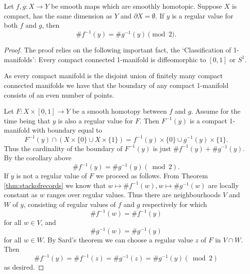 \begin{lemma}
    Let $f, g: X \rightarrow Y$ be smooth maps which are smoothly homotopic. Suppose $X$ is compact, has the same dimension as $Y$ and $\partial X=\emptyset$. If $y$ is a regular value for both $f$ and $g$, then
$$
\# f^{-1}(y)=\# g^{-1}(y) \pmod{2}.
$$
\end{lemma}
\begin{proof}
The proof relies on the following important fact, the `Classification of 1-manifolds': Every compact connected 1-manifold is diffeomorphic to $[0,1]$ or $S^{1}$.

As every compact manifold is the disjoint union of finitely many compact connected manifolds we have that the boundary of any compact 1-manifold consists of an even number of points.

Let $F: X \times[0,1] \rightarrow Y$ be a smooth homotopy between $f$ and $g$. Assume for the time being that $y$ is also a regular value for $F$. Then $F^{-1}(y)$ is a compact 1-manifold with boundary equal to
$$
F^{-1}(y) \cap(X \times\{0\} \cup X \times\{1\})=f^{-1}(y) \times\{0\} \cup g^{-1}(y) \times\{1\}.
$$
Thus the cardinality of the boundary of $F^{-1}(y)$ is just $\# f^{-1}(y)+\# g^{-1}(y)$. By the corollary above
$$
\# f^{-1}(y)=\# g^{-1}(y)(\bmod 2).
$$
If $y$ is not a regular value of $F$ we proceed as follows. From Theorem \ref{thm:stackofrecords} we know that $w \mapsto \# f^{-1}(w), w \mapsto \# g^{-1}(w)$ are locally constant as $w$ ranges over regular values. Thus there are neighbourhoods $V$ and $W$ of $y$, consisting of regular values of $f$ and $g$ respectively for which
$$
\# f^{-1}(w)=\# f^{-1}(y)
$$
for all $w \in V$, and
$$
\# g^{-1}(w)=\# g^{-1}(y)
$$
for all $w \in W$. By Sard's theorem we can choose a regular value $z$ of $F$ in $V \cap W$. Then
$$
\# f^{-1}(y)=\# f^{-1}(z)=\# g^{-1}(z)=\# g^{-1}(y)(\bmod 2)
$$
as desired.
\end{proof}

